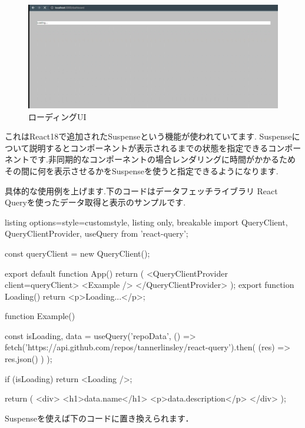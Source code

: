 \begin{figure}[H]
  \centering
  \includegraphics[width=12cm]{./image/03-Tech/chap4/07.png}
  \caption{ローディングUI}
\end{figure}




これはReact18で追加されたSuspenseという機能が使われていてます.
Suspenseについて説明するとコンポーネントが表示されるまでの状態を指定できるコンポーネントです.非同期的なコンポーネントの場合レンダリングに時間がかかるためその間に何を表示させるかをSuspenseを使うと指定できるようになります.

具体的な使用例を上げます.下のコードはデータフェッチライブラリ React Queryを使ったデータ取得と表示のサンプルです.






\begin{tcblisting}{listing options={style=customstyle}, listing only, breakable}
  import { QueryClient, QueryClientProvider, useQuery } from 'react-query';

  const queryClient = new QueryClient();

  export default function App() {
    return (
    <QueryClientProvider client={queryClient}>
    <Example />
    </QueryClientProvider>
    );
  }
  export function Loading() {
      return <p>Loading...</p>;
  }

  function Example() {
    const { isLoading, data } = useQuery('repoData', () =>
    fetch('https://api.github.com/repos/tannerlinsley/react-query').then(
    (res) => res.json()
    )
    );

    if (isLoading) return <Loading />;

    return (
      <div>
        <h1>{data.name}</h1>
        <p>{data.description}</p>
      </div>
    );
  }
\end{tcblisting}




Suspenseを使えば下のコードに置き換えられます．



